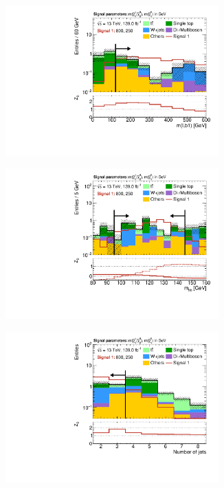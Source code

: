 \begin{figure}
\begin{subfigure}[b]{0.5\linewidth}
	\end{subfigure}\hfill
	\begin{subfigure}[b]{0.5\linewidth}
		\centering\includegraphics[width=0.9\textwidth]{N-1_cut_scan/n1_800_250/mlb1}
	\end{subfigure}\hfill
	\begin{subfigure}[b]{0.5\linewidth}
		\centering\includegraphics[width=0.9\textwidth]{N-1_cut_scan/n1_800_250/mbb_both}
	\end{subfigure}\hfill
	\begin{subfigure}[b]{0.5\linewidth}
		\centering\includegraphics[width=0.9\textwidth]{N-1_cut_scan/n1_800_250/nJet30}
	\end{subfigure}


\end{figure}
